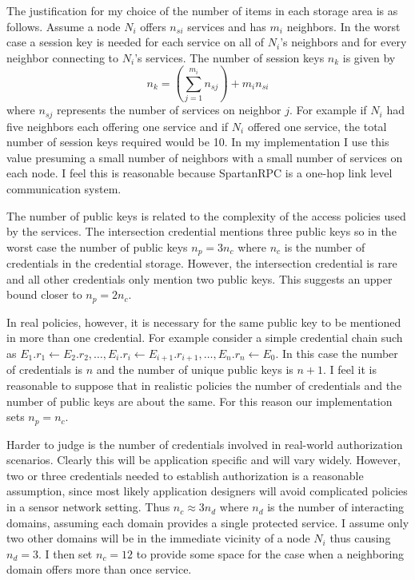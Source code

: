 The justification for my choice of the number of items in each storage area is as follows.
Assume a node $N_i$ offers $n_{si}$ services and has $m_i$ neighbors. In the worst case a
session key is needed for each service on all of $N_i$'s neighbors and for every neighbor
connecting to $N_i$'s services. The number of session keys $n_k$ is given by
\begin{displaymath}
n_k = \left(\sum_{j = 1}^{m_i} n_{sj}\right) + m_i n_{si}
\end{displaymath}
where $n_{sj}$ represents the number of services on neighbor $j$. For example if $N_i$ had five
neighbors each offering one service and if $N_i$ offered one service, the total number of
session keys required would be 10. In my implementation I use this value presuming a small
number of neighbors with a small number of services on each node. I feel this is reasonable
because SpartanRPC is a one-hop link level communication system.

The number of public keys is related to the complexity of the access policies used by the
services. The intersection credential mentions three public keys so in the worst case the number
of public keys $n_p = 3 n_c$ where $n_c$ is the number of credentials in the credential storage.
However, the intersection credential is rare and all other credentials only mention two public
keys. This suggests an upper bound closer to $n_p = 2 n_c$.

In real policies, however, it is necessary for the same public key to be mentioned in more than
one credential. For example consider a simple credential chain such as $E_1.r_1 \leftarrow
E_2.r_2, \ldots, E_i.r_i \leftarrow E_{i+1}.r_{i+1}, \ldots, E_n.r_n \leftarrow E_0$. In this
case the number of credentials is $n$ and the number of unique public keys is $n+1$. I feel it
is reasonable to suppose that in realistic policies the number of credentials and the number of
public keys are about the same. For this reason our implementation sets $n_p = n_c$.

Harder to judge is the number of credentials involved in real-world authorization scenarios.
Clearly this will be application specific and will vary widely. However, two or three
credentials needed to establish authorization is a reasonable assumption, since most likely
application designers will avoid complicated policies in a sensor network setting. Thus $n_c
\approx 3 n_d$ where $n_d$ is the number of interacting domains, assuming each domain provides a
single protected service. I assume only two other domains will be in the immediate vicinity of a
node $N_i$ thus causing $n_d = 3$. I then set $n_c = 12$ to provide some space for the case when
a neighboring domain offers more than once service.

